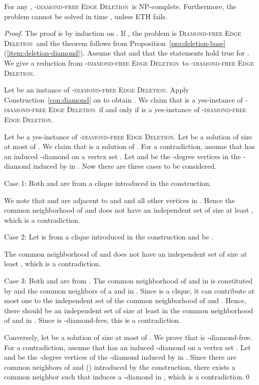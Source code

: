 \documentclass[envcountsame,envcountsect,10pt,oribibl]{llncs}
\newcommand{\pname}[1]{\textnormal{\textsc{#1}}}
\newcommand{\cclass}[1]{\textnormal{\textsf{#1}}}
\newcommand{\TDDED}{\pname{-diamond-free Edge Deletion}}
\newcommand{\TODDED}{\pname{-diamond-free Edge Deletion}}
\newcommand{\DED}{\pname{Diamond-free Edge Deletion}}
\newcommand{\NPC}{\cclass{NP-complete}}
\begin{document}
\begin{lemma}
  \label{lem:tdiamond}
  For any , \TDDED\ is \NPC. Furthermore,
  the problem cannot be solved in time , unless
  ETH fails.
\end{lemma}
\begin{proof}
  The proof is by induction on . If , the problem is \DED\ and the 
  theorem follows from Proposition~\ref{pro:deletion-base}(\ref{item:deletion-diamond}). 
  Assume that  and that the statements hold true for .
  We give a reduction from \TODDED\ to \TDDED. 

  Let  be an instance of \TODDED. Apply Construction~\ref{con:diamond}
  on  to obtain . We claim that  is a yes-instance of \TODDED\
  if and only if  is a yes-instance of \TDDED. 

  Let  be a yes-instance of \TODDED. Let  be a solution of size 
  at most  of . We claim that  is a solution of .
  For a contradiction, assume that  has an induced -diamond on a 
  vertex set . Let  and  be the -degree vertices in 
  the -diamond induced by  in . Now there are three cases to be considered.
  
  Case 1: Both  and  are 
  from a clique  introduced in the construction. 

  We note that  and 
  are adjacent to  and  and all other vertices in . Hence the common neighborhood
  of  and  does not have an independent set of size at least , which is a contradiction.

  Case 2: Let  is from a clique  introduced in the construction and  be .

  The common neighborhood
  of  and  does not have an independent set of size at least , which is a contradiction.

  Case 3: Both  and  are from . The common neighborhood of  and  in 
  is constituted by  and the common neighbors of  a and  in .
  Since  is a clique, it can contribute at most one to the independent set of the 
  common neighborhood of  and . Hence, there should be an independent set of size at least 
  in the common neighborhood of  and  in . Since  is -diamond-free, this is a contradiction.

  Conversely, let  be a solution of size at most  of . We prove that  is -diamond-free.
  For a contradiction, assume that  has an induced -diamond on a vertex set .
  Let  and  be the -degree vertices of the -diamond induced by  in .
  Since there are  common neighbors of  and  () introduced by the construction, 
  there exists a common neighbor  such that 
  induces a -diamond in , which is a contradiction.\qed
\end{proof}
\end{document}
